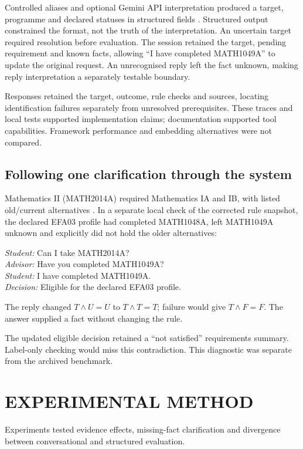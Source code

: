 Controlled aliases and optional Gemini API interpretation produced a target, programme and declared statuses in structured fields \cite{gemini,structured}. Structured output constrained the format, not the truth of the interpretation. An uncertain target required resolution before evaluation. The session retained the target, pending requirement and known facts, allowing ``I have completed MATH1049A'' to update the original request. An unrecognised reply left the fact unknown, making reply interpretation a separately testable boundary.

Responses retained the target, outcome, rule checks and sources, locating identification failures separately from unresolved prerequisites. These traces and local tests supported implementation claims; documentation supported tool capabilities. Framework performance and embedding alternatives were not compared.

\subsection{Following one clarification through the system}
Mathematics II (MATH2014A) required Mathematics IA and IB, with listed old/current alternatives \cite[p.84]{wits}. In a separate local check of the corrected rule snapshot, the declared EFA03 profile had completed MATH1048A, left MATH1049A unknown and explicitly did not hold the older alternatives:

\noindent\emph{Student:} Can I take MATH2014A?\\
\emph{Advisor:} Have you completed MATH1049A?\\
\emph{Student:} I have completed MATH1049A.\\
\emph{Decision:} Eligible for the declared EFA03 profile.

The reply changed $T\land U=U$ to $T\land T=T$; failure would give $T\land F=F$. The answer supplied a fact without changing the rule.

The updated eligible decision retained a ``not satisfied'' requirements summary. Label-only checking would miss this contradiction. This diagnostic was separate from the archived benchmark.

\section{EXPERIMENTAL METHOD}
Experiments tested evidence effects, missing-fact clarification and divergence between conversational and structured evaluation.

